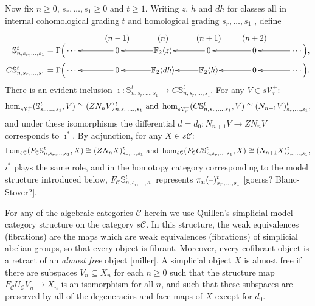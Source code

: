 \documentclass[11pt]{amsart}
\theoremstyle{plain}
\theoremstyle{definition}
\newcommand{\DASH}{\textup{--}}
\renewcommand{\to}{\longrightarrow}
\newcommand{\calC}{\mathcal{C}}
\newcommand{\calV}{\mathcal{V}}
\theoremstyle{plain}
\newcommand{\vect}[2]{\calV^{#1}_{#2}}
\newcommand{\F}{\mathbb{F}}
\begin{document}
\begin{Conventions and notation}
Now fix $n\geq0$, $s_r,\ldots,s_1\geq0$ and $t\geq1$. Writing $z$, $h$ and $dh$ for classes all in internal cohomological grading $t$ and homological grading $s_r,\ldots,s_1$ , define
\begin{gather*}
\phantom{C\mathbb{S}_{n,s_r,\ldots,s_1}^t=\Gamma\Bigl(}\xymatrix@R=1.5mm@1@!C{
&{\smash{(n-1)}}&{\smash{(n)}}&{\smash{(n+1)}}&{\smash{(n+2)}}\\
{\makebox[0cm][r]{$\,\mathbb{S}_{n,s_r,\ldots,s_1}^t=\Gamma\Bigl($}\cdots\,} &%
{\,0\,}\ar[l]
&%
\F_2\langle z\rangle\ar[l]
&%
{\,0\,}\ar[l]
&{\,0\,}\ar[l]
&{\,\cdots\Bigr),} \ar[l]
\\
{\makebox[0cm][r]{$\,C\mathbb{S}_{n,s_r,\ldots,s_1}^t=\Gamma\Bigl($}\cdots\,} &%
{\,0\,}\ar[l]
&%
\F_2\langle dh\rangle\ar[l]
&%
\F_2\langle h\rangle\ar[l]
&{\,0\,}\ar[l]
&{\,\cdots\Bigr).} \ar[l]
}
\end{gather*}
There is an evident inclusion $\imath:\mathbb{S}_{n,s_r,\ldots,s_1}^t\to C\mathbb{S}_{n,s_r,\ldots,s_1}^t$. For any $V\in s\vect{+}{r}$:
\[\hom_{s\vect{+}{r}}(\mathbb{S}^t_{s_r,\ldots,s_1},V)\cong (ZN_nV)_{n,s_r,\ldots,s_1}^t\textup{ and }\hom_{s\vect{+}{r}}(C\mathbb{S}^t_{n,s_r,\ldots,s_1},V)\cong (N_{n+1}V)_{s_r,\ldots,s_1}^t,\]
and under these isomorphisms the differential $d=d_0:N_{n+1}V\to ZN_nV$ corresponds to $\imath^*$.
By adjunction, for any $X\in s\calC$:
\[\hom_{s\calC}(F_\calC\mathbb{S}^t_{n,s_r,\ldots,s_1},X)\cong (ZN_nX)_{s_r,\ldots,s_1}^t\textup{ and }\hom_{s\calC}(F_{\calC}C\mathbb{S}^t_{n,s_r,\ldots,s_1},X)\cong (N_{n+1}X)_{s_r,\ldots,s_1}^t,\]
$i^*$ plays the same role, and in the homotopy category corresponding to the model structure introduced below, $F_\calC\mathbb{S}^t_{n,s_r,\ldots,s_1}$ represents $\pi_n(\DASH)^t_{s_r,\ldots,s_1}$ [goerss? Blanc-Stover?].

For any of the algebraic categories $\calC$ herein we use Quillen's simplicial model category structure on the category $s\calC$. In this structure, the weak equivalences (fibrations) are the maps which are weak equivalences (fibrations) of simplicial abelian groups, so that every object is fibrant. Moreover, every cofibrant object is a retract of an \emph{almost free} object [miller]. A simplicial object $X$ is almost free if there are subspaces $V_n\subseteq X_n$ for each $n\geq0$ such that the structure map $F_{\calC}U_\calC V_n\to X_n$ is an isomorphism for all $n$, and such that these subspaces are preserved by all of the degeneracies and face maps of $X$ except for $d_0$.


\end{Conventions and notation}
\end{document}
